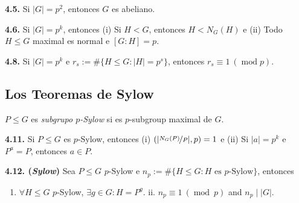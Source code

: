\begin{corollary}
    \textbf{4.5.} Si \(|G|= p^2\), entonces \(G\) es abeliano.  
\end{corollary}

\begin{theorem}
    \textbf{4.6.} Si \(|G|= p^k\), entonces (i) Si \(H < G\), entonces \(H < N_G(H)\) e (ii) Todo \(H \leq G\) maximal es normal e \([G : H ] = p\). 
\end{theorem}


\begin{theorem}
    \textbf{4.8.} Si \(|G|= p^k\) e \(r_s := \#\{H \leq G : |H| = p^s\}\), entonces \(r_s \equiv 1 \ (\operatorname{mod }p)\). 
\end{theorem}

\subsection*{Los Teoremas de Sylow}

\begin{definition}
    \(P\leq G\) es \emph{subgrupo $p$-Sylow} si es $p$-subgroup maximal de \(G\).  
\end{definition}

\hypertarget{lemma411}{}
\begin{lemma}
    \textbf{4.11.} Si \(P \leq G\) es $p$-Sylow, entonces (i) \((|\nicefrac{N_G(P)}{P}|, p) = 1 \) e (ii) Si \(|a| = p^k\) e \(P^a = P\), entonces \(a \in P\).   
\end{lemma}

\begin{theorem}
    \textbf{4.12. (\emph{Sylow})} Sea \(P\leq G\) $p$-Sylow e \(n_p := \#\{H \leq G : H \text{ es }p\text{-Sylow}\}\), entonces
    \vspace{-0.2cm}
    \begin{enumerate}[label = \roman*., left = 0.2cm]
        \item \(\forall H\leq G\) $p$-Sylow, \(\exists g \in G : H = P^g\). \hspace{1cm} ii. \( n_p \equiv 1 \ (\operatorname{mod}\ p)\) and \(n_p \mid |G|\).
    \end{enumerate}
\end{theorem} 

